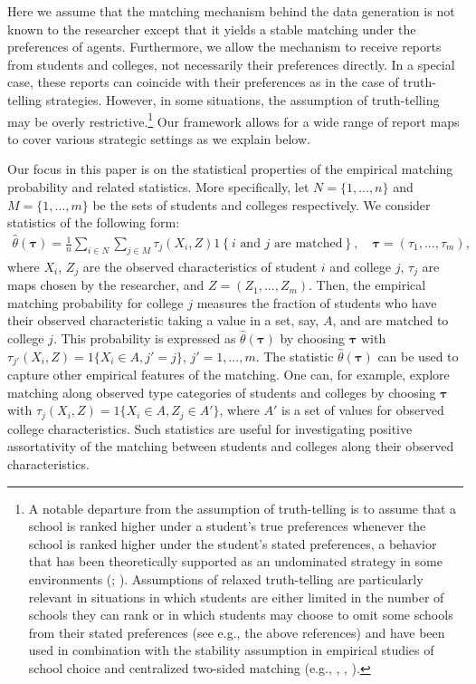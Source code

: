 \documentclass[12pt, fullpage]{amsart}
\theoremstyle{definition}
\theoremstyle{definition}
\theoremstyle{definition}
\begin{document}
\begin{bibunit}[econometrica]
    Here we assume that the matching mechanism behind the data generation is not known to the researcher except that it yields a stable matching under the preferences of agents. Furthermore, we allow the mechanism to receive reports from students and colleges, not necessarily their preferences directly. In a special case, these reports can coincide with their preferences as in the case of truth-telling strategies. However, in some situations, the assumption of truth-telling may be overly restrictive.\footnote{A notable departure from the assumption of truth-telling is to assume that a school is ranked higher under a student's true preferences whenever the school is ranked higher under the student's stated preferences, a behavior that has been theoretically supported as an undominated strategy in some environments (\cite{Haeringer/Klijn:2009:JET}; \cite{Fack/Grenet/He:AER:2019}). Assumptions of relaxed truth-telling are particularly relevant in situations in which students are either limited in the number of schools they can rank or in which students may choose to omit some schools from their stated preferences (see e.g., the above references) and have been used in combination with the stability assumption in  empirical studies of school choice and centralized two-sided matching (e.g., \cite{Fack/Grenet/He:AER:2019}, \cite{Aue/Klein/Ortega:2020:WP},  \cite{Combe/Tercieux/Terrier:2022:ReStud}).} Our framework allows for a wide range of report maps to cover various strategic settings as we explain below.
    
    Our focus in this paper is on the statistical properties of the empirical matching probability and related statistics. More specifically, let $N=\{1,...,n\}$ and $M = \{1,...,m\}$ be the sets of students and colleges respectively. We consider statistics of the following form:
    \begin{align}\label{generalized statistic}
    	\hat \theta(\boldsymbol{\tau}) = \frac{1}{n} \sum_{i \in N} \sum_{j \in M} \tau_j\left( X_i, Z \right) 1\left\{i\text{ and }j\text{ are matched} \right\}, \quad \boldsymbol{\tau} = (\tau_1,...,\tau_m),
    \end{align}
    where $X_{i}$, $Z_{j}$ are the observed characteristics of student $i$ and college $j$, $\tau_j$ are maps chosen by the researcher, and $Z=(Z_{1},...,Z_m)$. Then, the empirical matching probability for college $j$ measures the fraction of students who have their observed characteristic taking a value in a set, say, $A$, and are matched to college $j$. This probability is expressed as $\hat \theta(\boldsymbol{\tau})$ by choosing $ \boldsymbol{\tau}$ with $\tau_{j'}(X_{i},Z)=1\{X_{i}\in A, j' = j\}$, $j'=1,...,m$. The statistic $\hat \theta(\boldsymbol{\tau})$ can be used to capture other empirical features of the matching. One can, for example, explore matching along observed type categories of students and colleges by choosing $\boldsymbol{\tau}$ with $\tau_{j}(X_{i},Z)=1\{X_i \in A, Z_{j} \in A' \}$, where $A'$ is a set of values for observed college characteristics. Such statistics are useful for investigating positive assortativity of the matching between students and colleges along their observed characteristics.
    

\end{bibunit}
\end{document}
